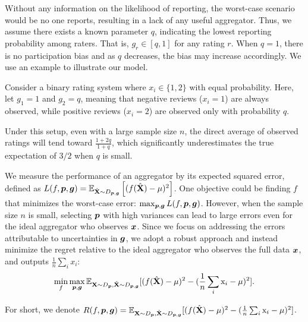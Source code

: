 Without any information on the likelihood of reporting, the worst-case scenario would be no one reports, resulting in a lack of any useful aggregator. Thus, we assume there exists a known parameter $q$, indicating the lowest reporting probability among raters. That is, $g_r\in [q,1]$ for any rating $r$. When $q=1$, there is no participation bias and as $q$ decreases, the bias may increase accordingly. We use an example to illustrate our model.

\begin{example}
Consider a binary rating system where \( x_i \in \{1, 2\} \) with equal probability. Here, let \( g_1 = 1 \) and \( g_2 = q \), meaning that negative reviews (\( x_i = 1 \)) are always observed, while positive reviews (\( x_i = 2 \)) are observed only with probability \( q \).

Under this setup, even with a large sample size \( n \), the direct average of observed ratings will tend toward \( \frac{1+2q}{1+q} \), which significantly underestimates the true expectation of \( 3/2 \) when \( q \) is small.


\end{example}


We measure the performance of an aggregator by its expected squared error, defined as \(L(f,{\bm{p}},{\bm{g}})=\mathbb{E}_{\hat{{\mathbf{X}}} \sim D_{{\bm{p}}, {\bm{g}}}} \left[(f(\hat{{\mathbf{X}}}) - \mu)^2\right]\). One objective could be finding \(f\) that minimizes the worst-case error: $\max_{{\bm{p}},{\bm{g}}}L(f,{\bm{p}},{\bm{g}})$. However, when the sample size $n$ is small, selecting ${\bm{p}}$ with high variances can lead to large errors even for the ideal aggregator who observes \({\bm{x}}\). Since we focus on addressing the errors attributable to uncertainties in ${\bm{g}}$, we adopt a robust approach and instead minimize the regret relative to the ideal aggregator who observes the full data \({\bm{x}}\), and outputs \(\frac{1}{n} \sum_i x_i\): $$\min_f\max_{{\bm{p}},{\bm{g}}}\mathbb{E}_{{\mathbf{X}}\sim D_{{\bm{p}}}, \hat{{\mathbf{X}}}\sim D_{{\bm{p}},{\bm{g}}}}[(f(\hat{{\mathbf{X}}})-\mu)^2-(\frac{1}{n}\sum_i {{\textnormal{x}}}_i-\mu)^2].$$


For short, we denote $R(f,{\bm{p}},{\bm{g}})=\mathbb{E}_{{\mathbf{X}}\sim D_{{\bm{p}}}, \hat{{\mathbf{X}}}\sim D_{{\bm{p}},{\bm{g}}}}[(f(\hat{{\mathbf{X}}})-\mu)^2-(\frac{1}{n}\sum_i {{\textnormal{x}}}_i-\mu)^2]$.

